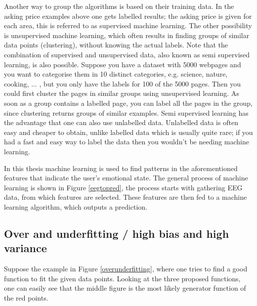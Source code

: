\npar

Another way to group the algorithms is based on their training data. In the asking price examples above one gets labelled results; the asking price is given for each area, this is referred to as supervised machine learning. The other possibility is unsupervised machine learning, which often results in finding groups of similar data points (clustering), without knowing the actual labels. Note that the combination of supervised and unsupervised data, also known as semi supervised learning, is also possible. Suppose you have a dataset with 5000 webpages and you want to categorise them in 10 distinct categories, e.g. science, nature, cooking, ... , but you only have the labels for 100 of the 5000 pages. Then you could first cluster the pages in similar groups using unsupervised learning. As soon as a group contains a labelled page, you can label all the pages in the group, since clustering returns groups of similar examples. Semi supervised learning has the advantage that one can also use unlabelled data. Unlabelled data is often easy and cheaper to obtain, unlike labelled data which is usually quite rare; if you had a fast and easy way to label the data then you wouldn't be needing machine learning.

\npar

In this thesis machine learning is used to find patterns in the aforementioned features that indicate the user's emotional state. The general process of machine learning is shown in Figure \ref{eegtopred}, the process starts with gathering EEG data, from which features are selected. These features are then fed to a machine learning algorithm, which outputs a prediction.



\subsection{Over and underfitting / high bias and high variance}


Suppose the example in Figure \ref{overunderfitting}, where one tries to find a good function to fit the given data points. Looking at the three proposed functions, one can easily see that the middle figure is the most likely generator function of the red points. 

